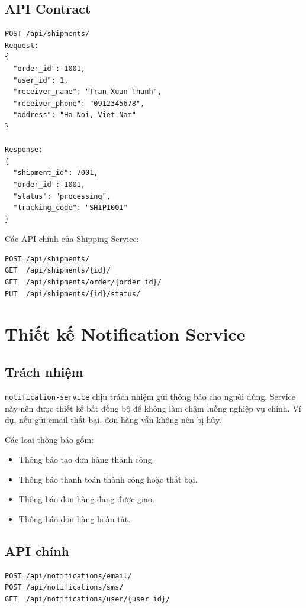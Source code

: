 \subsection{API Contract}

\begin{lstlisting}[style=code]
POST /api/shipments/
Request:
{
  "order_id": 1001,
  "user_id": 1,
  "receiver_name": "Tran Xuan Thanh",
  "receiver_phone": "0912345678",
  "address": "Ha Noi, Viet Nam"
}

Response:
{
  "shipment_id": 7001,
  "order_id": 1001,
  "status": "processing",
  "tracking_code": "SHIP1001"
}
\end{lstlisting}

Các API chính của Shipping Service:

\begin{lstlisting}[style=code]
POST /api/shipments/
GET  /api/shipments/{id}/
GET  /api/shipments/order/{order_id}/
PUT  /api/shipments/{id}/status/
\end{lstlisting}

\section{Thiết kế Notification Service}

\subsection{Trách nhiệm}

\texttt{notification-service} chịu trách nhiệm gửi thông báo cho người dùng. Service này nên được thiết kế bất đồng bộ để không làm chậm luồng nghiệp vụ chính. Ví dụ, nếu gửi email thất bại, đơn hàng vẫn không nên bị hủy.

Các loại thông báo gồm:

\begin{itemize}
  \item Thông báo tạo đơn hàng thành công.
  \item Thông báo thanh toán thành công hoặc thất bại.
  \item Thông báo đơn hàng đang được giao.
  \item Thông báo đơn hàng hoàn tất.
\end{itemize}

\subsection{API chính}

\begin{lstlisting}[style=code]
POST /api/notifications/email/
POST /api/notifications/sms/
GET  /api/notifications/user/{user_id}/
\end{lstlisting}

